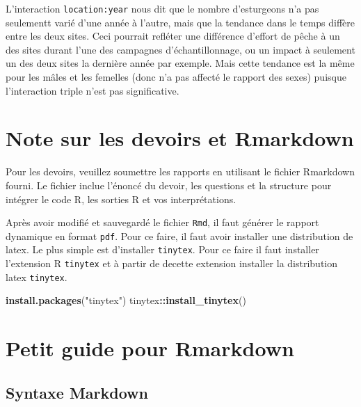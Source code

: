 \documentclass[12pt,]{book}
\newenvironment{Shaded}{\begin{snugshade}}{\end{snugshade}}
\newcommand{\KeywordTok}[1]{\textcolor[rgb]{0.13,0.29,0.53}{\textbf{#1}}}
\newcommand{\NormalTok}[1]{#1}
\newcommand{\OperatorTok}[1]{\textcolor[rgb]{0.81,0.36,0.00}{\textbf{#1}}}
\newcommand{\StringTok}[1]{\textcolor[rgb]{0.31,0.60,0.02}{#1}}
\begin{document}
L'interaction \texttt{location:year} nous dit que le nombre d'esturgeons n'a pas seulementt varié d'une année à l'autre, mais que la tendance dans le temps diffère entre les deux sites. Ceci pourrait refléter une différence d'effort de pêche à un des sites durant l'une des campagnes d'échantillonnage, ou un impact à seulement un des deux sites la dernière année par exemple. Mais cette tendance est la même pour les mâles et les femelles (donc n'a pas affecté le rapport des sexes) puisque l'interaction triple n'est pas significative.

\cleardoublepage

\hypertarget{appendix-appendice}{%
\appendix {}}


\hypertarget{note-sur-les-devoirs-et-rmarkdown}{%
\chapter{Note sur les devoirs et Rmarkdown}\label{note-sur-les-devoirs-et-rmarkdown}}

Pour les devoirs, veuillez soumettre les rapports en utilisant le fichier Rmarkdown fourni.
Le fichier inclue l'énoncé du devoir, les questions et la structure pour intégrer le code R, les sorties R et vos interprétations.

Après avoir modifié et sauvegardé le fichier \texttt{Rmd}, il faut générer le rapport dynamique en format \texttt{pdf}.
Pour ce faire, il faut avoir installer une distribution de latex. Le plus simple est d'installer \texttt{tinytex}. Pour ce faire il faut installer l'extension R \texttt{tinytex} et à partir de decette extension installer la distribution latex \texttt{tinytex}.

\begin{Shaded}
\begin{Highlighting}[]
\KeywordTok{install.packages}\NormalTok{(}\StringTok{"tinytex"}\NormalTok{)}
\NormalTok{tinytex}\OperatorTok{::}\KeywordTok{install_tinytex}\NormalTok{()}
\end{Highlighting}
\end{Shaded}

\hypertarget{petit-guide-pour-rmarkdown}{%
\chapter{Petit guide pour Rmarkdown}\label{petit-guide-pour-rmarkdown}}

\hypertarget{syntaxe-markdown}{%
\section{Syntaxe Markdown}\label{syntaxe-markdown}}
\end{document}
